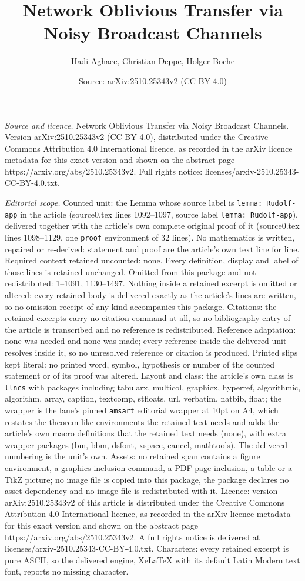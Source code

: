 \documentclass[10pt,a4paper]{amsart}
\title[Network Oblivious Transfer via Noisy Broadcast Channels]{Network Oblivious Transfer via Noisy Broadcast Channels}
\author{Hadi Aghaee, Christian Deppe, Holger Boche}
\date{Source: arXiv:2510.25343v2 (CC BY 4.0)}
\begin{document}
\maketitle

\noindent\emph{Source and licence.} Network Oblivious Transfer via Noisy Broadcast Channels. Version arXiv:2510.25343v2 (CC BY 4.0), distributed under the Creative Commons Attribution 4.0 International licence, as recorded in the arXiv licence metadata for this exact version and shown on the abstract page https://arxiv.org/abs/2510.25343v2. Full rights notice: licenses/arxiv-2510.25343-CC-BY-4.0.txt.\par\smallskip

\noindent\textit{Editorial scope.} Counted unit: the Lemma whose source label is \texttt{lemma: Rudolf-app} in the article (source0.tex lines 1092--1097, source label \texttt{lemma: Rudolf-app}), delivered together with the article's own complete original proof of it (source0.tex lines 1098--1129, one \texttt{proof} environment of 32 lines). No mathematics is written, repaired or re-derived: statement and proof are the article's own text line for line. Required context retained uncounted: none. Every definition, display and label of those lines is retained unchanged. Omitted from this package and not redistributed: 1--1091, 1130--1497. Nothing inside a retained excerpt is omitted or altered: every retained body is delivered exactly as the article's lines are written, so no omission receipt of any kind accompanies this package. Citations: the retained excerpts carry no citation command at all, so no bibliography entry of the article is transcribed and no reference is redistributed. Reference adaptation: none was needed and none was made; every reference inside the delivered unit resolves inside it, so no unresolved reference or citation is produced. Printed slips kept literal: no printed word, symbol, hypothesis or number of the counted statement or of its proof was altered. Layout and class: the article's own class is \texttt{llncs} with packages including tabularx, multicol, graphicx, hyperref, algorithmic, algorithm, array, caption, textcomp, stfloats, url, verbatim, natbib, float; the wrapper is the lane's pinned \texttt{amsart} editorial wrapper at 10pt on A4, which restates the theorem-like environments the retained text needs and adds the article's own macro definitions that the retained text needs (none), with extra wrapper packages (bm, bbm, dsfont, xspace, cancel, mathtools). The delivered numbering is the unit's own. Assets: no retained span contains a figure environment, a graphics-inclusion command, a PDF-page inclusion, a table or a TikZ picture; no image file is copied into this package, the package declares no asset dependency and no image file is redistributed with it. Licence: version arXiv:2510.25343v2 of this article is distributed under the Creative Commons Attribution 4.0 International licence, as recorded in the arXiv licence metadata for this exact version and shown on the abstract page https://arxiv.org/abs/2510.25343v2. A full rights notice is delivered at licenses/arxiv-2510.25343-CC-BY-4.0.txt. Characters: every retained excerpt is pure ASCII, so the delivered engine, XeLaTeX with its default Latin Modern text font, reports no missing character.
\end{document}
